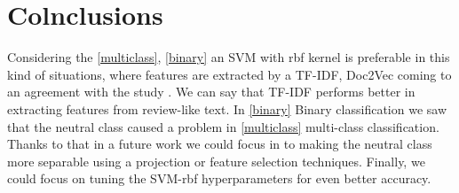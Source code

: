 \documentclass{article}
\begin{document}
\section{Colnclusions}

Considering the \ref{multiclass}, \ref{binary} an SVM with rbf kernel is preferable in this kind 
of situations, where features are extracted by a TF-IDF, Doc2Vec coming to an agreement
with the study \cite{studyPaper}. We can say that TF-IDF performs better in extracting 
features from review-like text. In \ref{binary} Binary classification we saw that the 
neutral class caused a problem in \ref{multiclass} multi-class classification. Thanks to that
in a future work we could focus in to making the neutral class more separable using a projection
or feature selection techniques. Finally, we could focus on tuning the SVM-rbf hyperparameters 
for even better accuracy.




\end{document}
